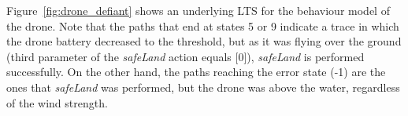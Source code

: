%
%
%
%
%
Figure~\ref{fig:drone_defiant} shows an underlying LTS for the behaviour model of the drone. Note that the paths that end at states 5 or 9 indicate a trace in which the drone battery decreased to the threshold, but as it was flying over the ground (third parameter of the \textit{safeLand} action equals [0]), \textit{safeLand} is performed successfully. On the other hand, the paths reaching the error state (-1) are the ones that \textit{safeLand} was performed, but the drone was above the water, regardless of the wind strength. 

